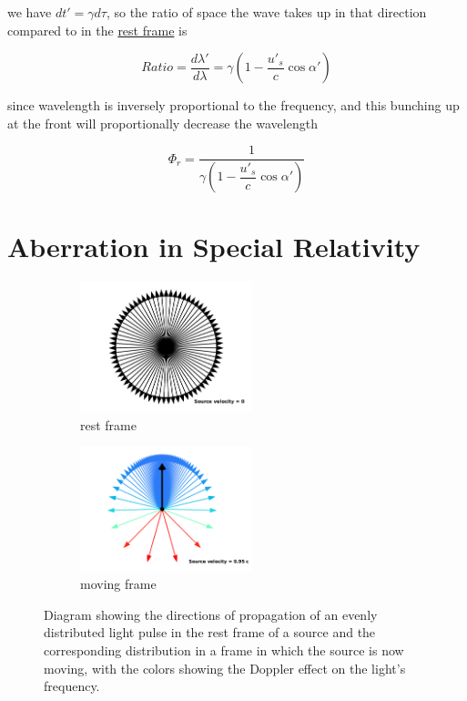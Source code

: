 we have $dt'=\gamma d\tau$, so the ratio of space the wave takes up in that direction compared to in the \hyperlink{def-proper-frame}{rest frame} is

\begin{equation}
	Ratio = \frac{d\lambda'}{d\lambda} = \gamma \left(1-\dfrac{u'_s}{c} \cos\alpha' \right)
\end{equation}

since wavelength is inversely proportional to the frequency, and this bunching up at the front will proportionally decrease the wavelength

\begin{equation}
	\Phi_r = \frac{1}{ \gamma \left(1-\dfrac{u'_s}{c} \cos\alpha' \right)}
\end{equation}

\section{Aberration in Special Relativity}

\begin{figure}[ht]
	\begin{subfigure}{.49\textwidth}
		\centering
		\includegraphics[width=5cm]{images/pdf/Aberrated_velocities_restframe.pdf}
		\caption{rest frame}
	\end{subfigure}
	\begin{subfigure}{.49\textwidth}
		\centering
		\includegraphics[width=5cm]{images/pdf/Aberrated_velocities.pdf}
		\caption{moving frame}
	\end{subfigure}
	\caption{Diagram showing the directions of propagation of an evenly distributed light pulse in the rest frame of a source and the corresponding distribution in a frame in which the source is now moving, with the colors showing the Doppler effect on the light's frequency.}
	\label{fig: aberrated emitted light}
\end{figure}

